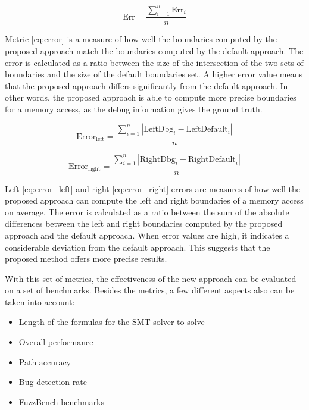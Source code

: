 \documentclass[conference]{IEEEtran}
\begin{document}
\begin{equation}
    \label{eq:error}
    \text{Err}=\frac{\sum_{i=1}^n{\text{Err}_i}}{n}
\end{equation}

Metric \ref{eq:error} is a measure of how well the boundaries computed by the proposed approach match the boundaries computed by the default approach. The error is calculated as a ratio between the size of the intersection of the two sets of boundaries and the size of the default boundaries set. A higher error value means that the proposed approach differs significantly from the default approach. In other words, the proposed approach is able to compute more precise boundaries for a memory access, as the debug information gives the ground truth.

\begin{equation}
    \label{eq:error_left}
    \text{Error}_\text{left}=\frac{\sum_{i=1}^n{|\text{LeftDbg}_i-\text{LeftDefault}_i|}}{n}
\end{equation}

\begin{equation}
    \label{eq:error_right}
    \text{Error}_\text{right}=\frac{\sum_{i=1}^n{|\text{RightDbg}_i-\text{RightDefault}_i|}}{n}
\end{equation}

Left \ref{eq:error_left} and right \ref{eq:error_right} errors are measures of how well the proposed approach can compute the left and right boundaries of a memory access on average. The error is calculated as a ratio between the sum of the absolute differences between the left and right boundaries computed by the proposed approach and the default approach. When error values are high, it indicates a considerable deviation from the default approach. This suggests that the proposed method offers more precise results.

With this set of metrics, the effectiveness of the new approach can be evaluated on a set of benchmarks. Besides the metrics, a few different aspects also can be taken into account:

\begin{itemize}
    \item Length of the formulas for the SMT solver to solve
    \item Overall performance
    \item Path accuracy
    \item Bug detection rate
    \item FuzzBench \cite{FuzzBench} benchmarks
\end{itemize}
\end{document}
